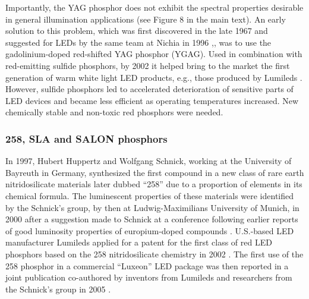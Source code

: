\documentclass[10pt]{article}
\begin{document}
Importantly, the YAG phosphor does not exhibit the spectral properties desirable in general illumination applications (see Figure 8 in the main text). An early solution to this problem, which was first discovered in the late 1967 \cite{holloway1969optical} and suggested for LEDs by the same team at Nichia in 1996 \cite{bando1998development},\cite{shimizu1999light}, was to use the gadolinium-doped red-shifted YAG phosphor (YGAG). Used in combination with red-emitting sulfide phosphors, by 2002 it helped bring to the market the first generation of warm white light LED products, e.g., those produced by Lumileds \cite{Mueller2002}. However, sulfide phosphors led to accelerated deterioration of sensitive parts of LED devices and became less efficient as operating temperatures increased. New chemically stable and non-toxic red phosphors were needed. 

\subsubsection{258, SLA and SALON phosphors}

In 1997, Hubert Huppertz and Wolfgang Schnick, working at the University of Bayreuth in Germany, synthesized the first compound in a new class of rare earth nitridosilicate materials \cite{Huppertz1997} later dubbed “258” due to a proportion of elements in its chemical formula. The luminescent properties of these materials were identified by the Schnick’s group, by then at Ludwig-Maximilians University of Munich, in 2000 \cite{Hppe2000} after a suggestion made to Schnick at a conference following earlier reports of good luminosity properties of europium-doped compounds \cite{Qiua1998}. U.S.-based LED manufacturer Lumileds applied for a patent for the first class of red LED phosphors based on the 258 nitridosilicate chemistry in 2002 \cite{mueller2004phosphor}. The first use of the 258 phosphor in a commercial “Luxeon” LED package was then reported in a joint publication co-authored by inventors from Lumileds and researchers from the Schnick’s group in 2005 \cite{MuellerMach2005}.
\end{document}
